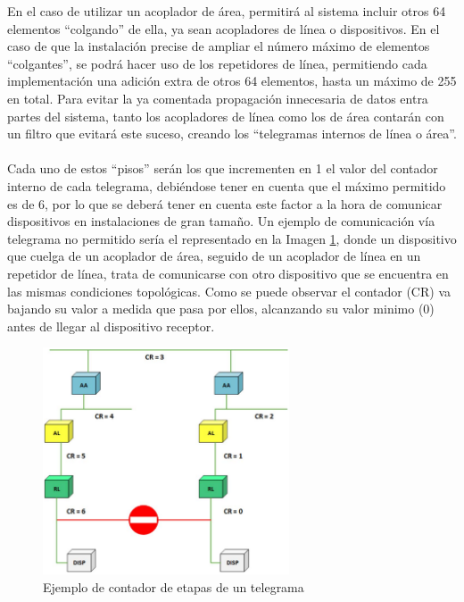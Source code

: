 En el caso de utilizar un acoplador de área,  permitirá al sistema incluir otros 64 elementos “colgando” de ella, ya sean acopladores de línea o dispositivos. En el caso de que la instalación precise de ampliar el número máximo de elementos “colgantes”, se podrá hacer uso de los repetidores de línea, permitiendo cada implementación una adición extra de otros 64 elementos, hasta un máximo de 255 en total. Para evitar la ya comentada propagación innecesaria de datos entra partes del sistema, tanto los acopladores de línea como los de área contarán con un filtro que evitará este suceso, creando los “telegramas internos de línea o área”. \\\\
Cada uno de estos “pisos” serán los que incrementen en 1 el valor del contador interno de cada telegrama, debiéndose tener en cuenta que el máximo permitido es de 6, por lo que se deberá tener en cuenta este factor a la hora de comunicar dispositivos en instalaciones de gran tamaño. Un ejemplo de comunicación vía telegrama no permitido sería el representado en la Imagen \ref{fig:contador}, donde un dispositivo que cuelga de un acoplador de área, seguido de un acoplador de línea en un repetidor de línea, trata de comunicarse con otro dispositivo que se encuentra en las mismas condiciones topológicas. Como se puede observar el contador (CR) va bajando su valor a medida que pasa por ellos, alcanzando su valor minimo (0) antes de llegar al dispositivo receptor.
\begin{figure}[H]
\centering
\includegraphics[width=0.65\textwidth]{figures/contador.png} 
\caption{Ejemplo de contador de etapas de un telegrama}
\label{fig:contador}
\end{figure}
